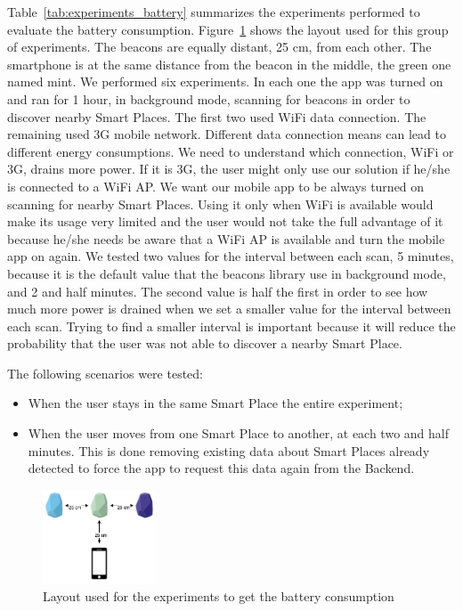 Table~\ref{tab:experiments_battery} summarizes the experiments performed to evaluate the battery consumption.
Figure~\ref{fig:layout_experiments_battery_consumption} shows the layout used for this group of experiments.
The beacons are equally distant, 25 cm, from each other.
The smartphone is at the same distance from the beacon in the middle, the green one named mint.
We performed six experiments.
In each one the app was turned on and ran for 1 hour, in background mode, scanning for beacons in order to discover nearby Smart Places.
The first two used \gls{WiFi} data connection.
The remaining used \gls{3G} mobile network.
Different data connection means can lead to different energy consumptions.
We need to understand which connection, \gls{WiFi} or \gls{3G}, drains more power.
If it is \gls{3G}, the user might only use our solution if he/she is connected to a \gls{WiFi} \gls{AP}.
We want our mobile app to be always turned on scanning for nearby Smart Places.
Using it only when \gls{WiFi} is available would make its usage very limited and the user would not take the full advantage of it because he/she needs be aware that a \gls{WiFi} \gls{AP} is available and turn the mobile app on again.
We tested two values for the interval between each scan, 5 minutes, because it is the default value that the beacons library use in background mode, and 2 and half minutes.
The second value is half the first in order to see how much more power is drained when we set a smaller value for the interval between each scan.
Trying to find a smaller interval is important because it will reduce the probability that the user was not able to discover a nearby Smart Place.

The following scenarios were tested:
\begin{itemize}
  \item
  When the user stays in the same Smart Place the entire experiment;
  \item
  When the user moves from one Smart Place to another, at each two and half minutes.
  This is done removing existing data about Smart Places already detected to force the app to request this data again from the Backend.
\end{itemize}



\begin{figure}[!ht]
  \centering
    \includegraphics[width=0.3\textwidth, keepaspectratio]{figures/experiments_battery_layout}
    \caption[Layout for experiments of battery consumption]{Layout used for the experiments to get the battery consumption}
    \label{fig:layout_experiments_battery_consumption}
\end{figure}

